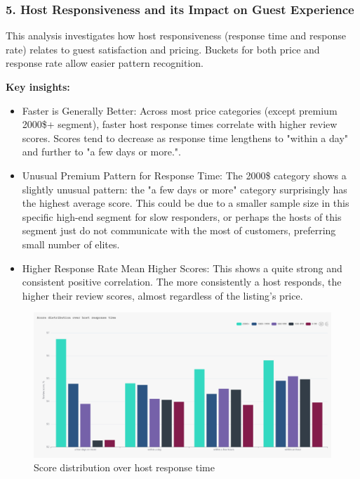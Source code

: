 \subsubsection*{5. Host Responsiveness and its Impact on Guest Experience }

This analysis investigates how host responsiveness (response time and response rate) relates to guest satisfaction and pricing. Buckets for both price and response rate allow easier pattern recognition.

\vspace{0.5em}
\textbf{Key insights:}
\begin{itemize}
    \item Faster is Generally Better: Across most price categories (except premium 2000\$+ segment), faster host response times correlate with higher review scores. Scores tend to decrease as response time lengthens to "within a day" and further to "a few days or more.".
    \item Unusual Premium Pattern for Response Time: The 2000\$ category shows a slightly unusual pattern: the "a few days or more" category surprisingly has the highest average score. This could be due to a smaller sample size in this specific high-end segment for slow responders, or perhaps the hosts of this segment just do not communicate with the most of customers, preferring small number of elites.
    \item Higher Response Rate Mean Higher Scores: This shows a quite strong and consistent positive correlation. The more consistently a host responds, the higher their review scores, almost regardless of the listing's price.
\end{itemize}

\vspace{1em}
\begin{figure}[H]
    \centering
    \includegraphics[width=1\textwidth]{images/q5_1.jpg}
    \caption{Score distribution over host response time}
    \label{fig:figureq9}
\end{figure}

